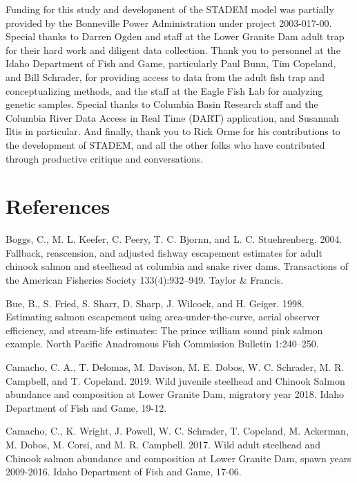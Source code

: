 \documentclass[
  12pt,
]{article}
\begin{document}
Funding for this study and development of the STADEM model was partially provided by the Bonneville Power Administration under project 2003-017-00. Special thanks to Darren Ogden and staff at the Lower Granite Dam adult trap for their hard work and diligent data collection. Thank you to personnel at the Idaho Department of Fish and Game, particularly Paul Bunn, Tim Copeland, and Bill Schrader, for providing access to data from the adult fish trap and conceptualizing methods, and the staff at the Eagle Fish Lab for analyzing genetic samples. Special thanks to Columbia Basin Research staff and the Columbia River Data Access in Real Time (DART) application, and Susannah Iltis in particular. And finally, thank you to Rick Orme for his contributions to the development of STADEM, and all the other folks who have contributed through productive critique and conversations.

\newpage

\hypertarget{references}{%
\section{References}\label{references}}

\hypertarget{refs}{}
\leavevmode\hypertarget{ref-Boggs2004}{}%
Boggs, C., M. L. Keefer, C. Peery, T. C. Bjornn, and L. C. Stuehrenberg. 2004. Fallback, reascension, and adjusted fishway escapement estimates for adult chinook salmon and steelhead at columbia and snake river dams. Transactions of the American Fisheries Society 133(4):932--949. Taylor \& Francis.

\leavevmode\hypertarget{ref-Bue1998}{}%
Bue, B., S. Fried, S. Sharr, D. Sharp, J. Wilcock, and H. Geiger. 1998. Estimating salmon escapement using area-under-the-curve, aerial observer efficiency, and stream-life estimates: The prince william sound pink salmon example. North Pacific Anadromous Fish Commission Bulletin 1:240--250.

\leavevmode\hypertarget{ref-Camacho2019}{}%
Camacho, C. A., T. Delomas, M. Davison, M. E. Dobos, W. C. Schrader, M. R. Campbell, and T. Copeland. 2019. Wild juvenile steelhead and Chinook Salmon abundance and composition at Lower Granite Dam, migratory year 2018. Idaho Department of Fish and Game, 19-12.

\leavevmode\hypertarget{ref-Camacho2017}{}%
Camacho, C., K. Wright, J. Powell, W. C. Schrader, T. Copeland, M. Ackerman, M. Dobos, M. Corsi, and M. R. Campbell. 2017. Wild adult steelhead and Chinook salmon abundance and composition at Lower Granite Dam, spawn years 2009-2016. Idaho Department of Fish and Game, 17-06.
\end{document}
